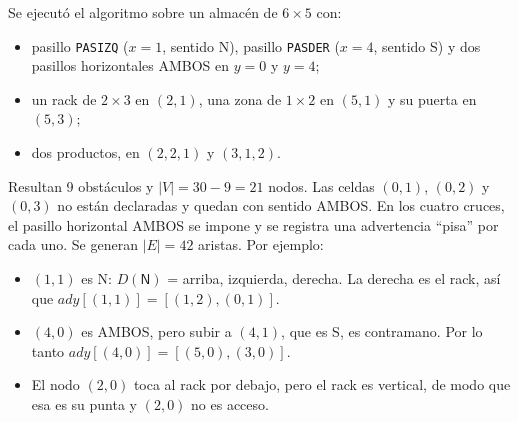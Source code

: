 \documentclass[11pt,a4paper]{article}
\theoremstyle{definition}
\newcommand{\sN}{\textsf{N}}
\newcommand{\sS}{\textsf{S}}
\newcommand{\sA}{\textsf{AMBOS}}
\begin{document}
Se ejecutó el algoritmo sobre un almacén de $6\times5$ con:
\begin{itemize}[leftmargin=*]
\item pasillo \texttt{PAS{}IZQ} ($x=1$, sentido \sN), pasillo \texttt{PAS{}DER} ($x=4$, sentido \sS) y dos pasillos horizontales \sA{} en $y=0$ y $y=4$;
\item un rack de $2\times3$ en $(2,1)$, una zona de $1\times2$ en $(5,1)$ y su puerta en $(5,3)$;
\item dos productos, en $(2,2,1)$ y $(3,1,2)$.
\end{itemize}
Resultan 9 obstáculos y $|V|=30-9=21$ nodos. Las celdas $(0,1)$, $(0,2)$ y $(0,3)$ no están declaradas y quedan con sentido \sA. En los cuatro cruces, el pasillo horizontal \sA{} se impone y se registra una advertencia ``pisa'' por cada uno. Se generan $|E|=42$ aristas. Por ejemplo:
\begin{itemize}[leftmargin=*]
\item $(1,1)$ es \sN: $D(\sN)$ = {arriba, izquierda, derecha}. La derecha es el rack, así que $ady[(1,1)]=[(1,2),(0,1)]$.
\item $(4,0)$ es \sA, pero subir a $(4,1)$, que es \sS, es contramano. Por lo tanto $ady[(4,0)]=[(5,0),(3,0)]$.
\item El nodo $(2,0)$ toca al rack por debajo, pero el rack es vertical, de modo que esa es su punta y $(2,0)$ no es acceso.
\end{itemize}
\end{document}
